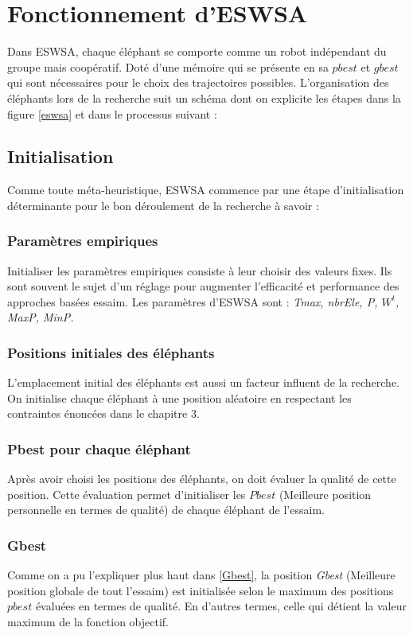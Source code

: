 \section{Fonctionnement d'ESWSA}
Dans ESWSA, chaque éléphant se comporte comme un robot indépendant du groupe mais coopératif. Doté d'une mémoire qui se présente en sa $pbest$ et $gbest$ qui sont nécessaires pour le choix des trajectoires possibles. L'organisation des éléphants lors de la recherche suit un schéma dont on explicite les étapes dans la figure \ref{eswsa} et dans le processus suivant :



\subsection{Initialisation}
Comme toute méta-heuristique, ESWSA commence par une étape d'initialisation déterminante pour le bon déroulement de la recherche à savoir :
\subsubsection{Paramètres empiriques}
Initialiser les paramètres empiriques consiste à leur choisir des valeurs fixes. Ils sont souvent le sujet d'un réglage pour augmenter l'efficacité et performance des approches basées essaim. Les paramètres d'ESWSA sont : 
\textit{Tmax, nbrEle, P, $W^t$, MaxP, MinP.}

\subsubsection{Positions initiales des éléphants}
L'emplacement initial des éléphants est aussi un facteur influent de la recherche. On initialise chaque éléphant à une position aléatoire en respectant les contraintes énoncées dans le chapitre 3.

\subsubsection{Pbest pour chaque éléphant}
Après avoir choisi les positions des éléphants, on doit évaluer la qualité de cette position. Cette évaluation permet d'initialiser les $Pbest$ (Meilleure position personnelle en termes de qualité) de chaque éléphant de l'essaim.

\subsubsection{Gbest}
Comme on a pu l'expliquer plus haut dans \ref{Gbest}, la position \textit{Gbest} (Meilleure position globale de tout l'essaim) est initialisée selon le maximum des positions $pbest$ évaluées en termes de qualité. En d'autres termes, celle qui détient la valeur maximum de la fonction objectif.

